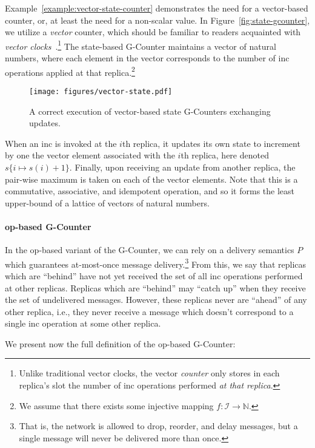 Example~\ref{example:vector-state-counter} demonstrates the need for a
vector-based counter, or, at least the need for a non-scalar value. In
Figure~\ref{fig:state-gcounter}, we utilize a \emph{vector} counter, which
should be familiar to readers acquainted with \emph{vector
clocks}~\citep{lamport78}.\footnote{Unlike traditional vector clocks, the vector
\emph{counter} only stores in each replica's slot the number of \textsf{inc}
operations performed \emph{at that replica}.} The state-based G-Counter maintains
a vector of natural numbers, where each element in the vector corresponds to the
number of \textsf{inc} operations applied at that replica.\footnote{We assume
that there exists some injective mapping $f : \mathcal{I} \to \mathbb{N}$.}

\begin{figure}[H]
  \centering
  \texttt{[image: figures/vector-state.pdf]}
    \caption{A correct execution of vector-based state G-Counters exchanging
      updates.}
\end{figure}

When an \textsf{inc} is invoked at the $i$th replica, it updates its own state
to increment by one the vector element associated with the $i$th replica, here
denoted $s\{i \mapsto s(i) + 1\}$. Finally, upon receiving an update from
another replica, the pair-wise maximum is taken on each of the vector elements.
Note that this is a commutative, associative, and idempotent operation, and so
it forms the least upper-bound of a lattice of vectors of natural numbers.

\paragraph{op-based G-Counter} In the op-based variant of the G-Counter, we can
rely on a delivery semantics $P$ which guarantees at-most-once message
delivery.\footnote{That is, the network is allowed to drop, reorder, and delay
messages, but a single message will never be delivered more than once.} From
this, we say that replicas which are ``behind'' have not yet received the set of
all \textsf{inc} operations performed at other replicas. Replicas which are
``behind'' may ``catch up'' when they receive the set of undelivered messages.
However, these replicas never are ``ahead'' of any other replica, i.e., they
never receive a message which doesn't correspond to a single \textsf{inc}
operation at some other replica.

We present now the full definition of the op-based G-Counter:

